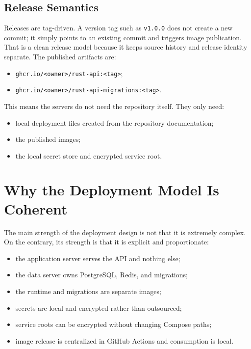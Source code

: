 \documentclass[11pt,a4paper]{article}
\begin{document}
\subsection{Release Semantics}

Releases are tag-driven. A version tag such as \texttt{v1.0.0} does not create a new commit; it simply points to an existing commit and triggers image publication. That is a clean release model because it keeps source history and release identity separate. The published artifacts are:

\begin{itemize}
  \item \texttt{ghcr.io/<owner>/rust-api:<tag>};
  \item \texttt{ghcr.io/<owner>/rust-api-migrations:<tag>}.
\end{itemize}

This means the servers do not need the repository itself. They only need:

\begin{itemize}
  \item local deployment files created from the repository documentation;
  \item the published images;
  \item the local secret store and encrypted service root.
\end{itemize}

\section{Why the Deployment Model Is Coherent}

The main strength of the deployment design is not that it is extremely complex. On the contrary, its strength is that it is explicit and proportionate:

\begin{itemize}
  \item the application server serves the API and nothing else;
  \item the data server owns PostgreSQL, Redis, and migrations;
  \item the runtime and migrations are separate images;
  \item secrets are local and encrypted rather than outsourced;
  \item service roots can be encrypted without changing Compose paths;
  \item image release is centralized in GitHub Actions and consumption is local.
\end{itemize}
\end{document}
